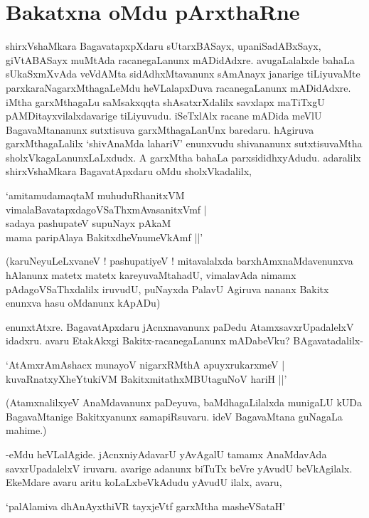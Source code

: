 \chapter{Bakatxna oMdu pArxthaRne}\label{chap11}

shirxVshaMkara BagavatapxpXdaru sUtarxBASayx, upaniSadABxSayx, giVtABASayx muMtAda racanegaLanunx mADidAdxre. avugaLalalxde bahaLa sUkaSxmXvAda veVdAMta sidAdhxMtavanunx sAmAnayx janarige tiLiyuvaMte parxkaraNagarxMthagaLeMdu heVLalapxDuva racanegaLanunx mADidAdxre. iMtha garxMthagaLu saMsakxqqta shAsatxrXdalilx savxlapx maTiTxgU pAMDitayxvilalxdavarige tiLiyuvudu. iSeTxlAlx racane mADida meVlU BagavaMtananunx sutxtisuva garxMthagaLanUnx baredaru. hAgiruva garxMthagaLalilx `shivAnaMda lahariV' enunxvudu shivananunx sutxtisuvaMtha sholxVkagaLanunxLaLxdudx. A garxMtha bahaLa parxsididhxyAdudu. adaralilx shirxVshaMkara BagavatApxdaru oMdu sholxVkadalilx,

\begin{shloka}
`amitamudamaqtaM muhuduRhanitxVM\\
vimalaBavatapxdagoVSaThxmAvasanitxVmf |\\
sadaya pashupateV supuNayx pAkaM\\
mama paripAlaya BakitxdheVnumeVkAmf ||'
\end{shloka}

(karuNeyuLeLxvaneV ! pashupatiyeV ! mitavalalxda barxhAmxnaMdavenunxva hAlanunx matetx matetx kareyuvaMtahadU, vimalavAda nimamx pAdagoVSaThxdalilx iruvudU, puNayxda PalavU Agiruva nananx Bakitx enunxva hasu oMdanunx kApADu)

enunxtAtxre. BagavatApxdaru jAcnxnavanunx paDedu AtamxsavxrUpadalelxV idadxru. avaru EtakAkxgi Bakitx-racanegaLanunx mADabeVku? BAgavatadalilx-

\begin{shloka}
`AtAmxrAmAshacx munayoV nigarxRMthA apuyxrukarxmeV |\\
kuvaRnatxyXheYtukiVM BakitxmitathxMBUtaguNoV hariH ||'
\end{shloka}

(AtamxnalilxyeV AnaMdavanunx paDeyuva, baMdhagaLilalxda munigaLU kUDa BagavaMtanige Bakitxyanunx samapiRsuvaru. ideV BagavaMtana guNagaLa mahime.)

-eMdu heVLalAgide. jAcnxniyAdavarU yAvAgalU tamamx AnaMdavAda savxrUpadalelxV iruvaru. avarige adanunx biTuTx beVre yAvudU beVkAgilalx. EkeMdare avaru aritu koLaLxbeVkAdudu yAvudU ilalx, avaru,

\begin{shloka}
`palAlamiva dhAnAyxthiVR tayxjeVtf garxMtha masheVSataH'
\end{shloka}

